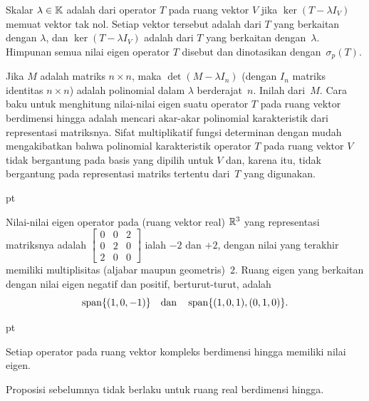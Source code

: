 \begin{defn} Skalar $\lambda \in \mathbb{K}$ adalah
 dari operator $T$ pada ruang vektor $V$ jika $\ker(T - \lambda I_V)$
memuat vektor tak nol. Setiap vektor tersebut adalah
 dari $T$ yang berkaitan dengan $\lambda$, dan $\ker(T - \lambda I_V)$ adalah
 dari $T$ yang berkaitan dengan~$\lambda$. Himpunan semua nilai eigen
operator $T$ disebut
 dan dinotasikan dengan~$\sigma_p(T)$.
\end{defn}

Jika $M$ adalah matriks $n \times n$, maka $\det(M - \lambda I_n)$ (dengan $I_n$ matriks identitas $n
\times n$) adalah polinomial dalam $\lambda$ berderajat~$n$. Inilah
 dari~$M$. Cara baku untuk menghitung nilai-nilai eigen suatu
operator $T$ pada ruang vektor berdimensi hingga adalah mencari akar-akar polinomial
karakteristik dari representasi matriksnya. Sifat multiplikatif fungsi determinan dengan mudah mengakibatkan
bahwa polinomial karakteristik operator $T$ pada ruang vektor $V$ tidak bergantung pada basis yang dipilih untuk $V$ dan,
karena itu, tidak bergantung pada representasi matriks tertentu dari~$T$ yang digunakan.

 pt

\begin{exam} Nilai-nilai eigen operator pada (ruang vektor real) $\mathbb{R}^3$ yang representasi matriksnya
adalah $ \begin{bmatrix} 0  &  0  &  2 \\
                                     0  &  2  &  0 \\
                                     2  &  0  &  0
                      \end{bmatrix}$ ialah $-2$ dan $+2$, dengan nilai yang terakhir memiliki multiplisitas (aljabar maupun
geometris)~$2$. Ruang eigen yang berkaitan dengan nilai eigen negatif dan positif, berturut-turut, adalah
\[
\operatorname{span}\{(1,0,-1)\}
\quad\text{dan}\quad
\operatorname{span}\{(1,0,1), (0,1,0)\}.
\]
\end{exam}

 pt

\begin{prop} Setiap operator pada ruang vektor kompleks berdimensi hingga memiliki nilai eigen.
\end{prop}

\begin{exam} Proposisi sebelumnya tidak berlaku untuk ruang real berdimensi hingga.
\end{exam}

